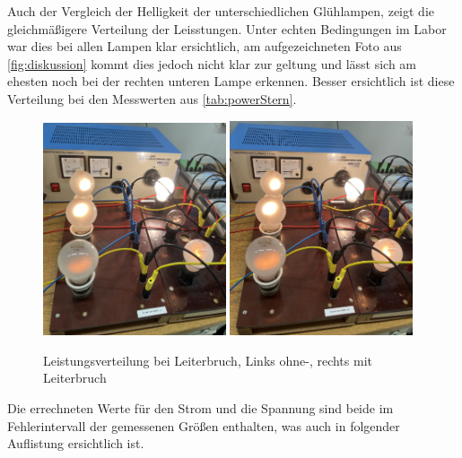 \documentclass[12pt,english,ngerman]{scrartcl}
\begin{document}
Auch der Vergleich der Helligkeit der unterschiedlichen Glühlampen, zeigt die
gleichmäßigere Verteilung der Leisstungen. Unter echten Bedingungen im Labor
war dies bei allen Lampen klar ersichtlich, am aufgezeichneten Foto aus
\autoref{fig:diskussion} kommt dies jedoch nicht klar zur geltung und lässt
sich am ehesten noch bei der rechten unteren Lampe erkennen. Besser ersichtlich
ist diese Verteilung bei den Messwerten aus \autoref{tab:powerStern}.

\begin{figure}[H]
	\begin{center}
		\includegraphics[width = 0.48\textwidth]{figures/erstes.png}
		\includegraphics[width = 0.48\textwidth]{figures/zweistes.png}
	\end{center}
	\caption[Leistungsverteilung bei Leiterbruch] {Leistungsverteilung bei Leiterbruch,
		Links ohne-, rechts mit Leiterbruch
	}\label{fig:diskussion}
\end{figure}

Die errechneten Werte für den Strom und die Spannung sind beide im
Fehlerintervall der gemessenen Größen enthalten, was auch in folgender
Auflistung ersichtlich ist.
\end{document}
